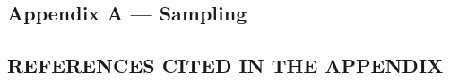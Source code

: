 \documentclass[nobib]{tufte-handout}
\begin{document}
\begin{appendices}

\begin{refsection}

\section{Appendix A --- Sampling}
\label{sec:sample_of_studies}


\subsection{REFERENCES CITED IN THE APPENDIX}

\printbibliography[heading=none]

\end{refsection}

\end{appendices}

\end{document}
